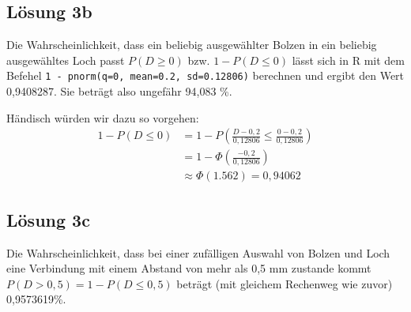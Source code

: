 \documentclass[main.tex]{subfiles}
\begin{document}
\subsection{Lösung 3b}
\lstset{language=R}

Die Wahrscheinlichkeit, dass ein beliebig ausgewählter Bolzen in ein beliebig ausgewähltes Loch passt $P(D \geq 0)$ bzw. $1-P(D \leq 0)$ lässt sich in R mit dem Befehel \lstinline|1 - pnorm(q=0, mean=0.2, sd=0.12806)| berechnen und ergibt den Wert 0,9408287. Sie beträgt also ungefähr 94,083 \%.

Händisch würden wir dazu so vorgehen: $$\begin{aligned}
    1 - P(D\leq 0) &= 1 - P\left(\frac{D- 0,2}{0,12806} \leq \frac{0-0,2}{0,12806}\right)\\[2mm]
    &= 1 - \Phi \left(\frac{-0,2}{0,12806}\right)\\[2mm]
    &\approx \Phi(1.562) = 0,94062
\end{aligned}$$

\subsection{Lösung 3c}
Die Wahrscheinlichkeit, dass bei einer zufälligen Auswahl von Bolzen und Loch eine Verbindung mit einem Abstand von mehr als 0,5 mm zustande kommt $P(D > 0,5) = 1 - P(D\leq 0,5)$ beträgt (mit gleichem Rechenweg wie zuvor) 0,9573619\%.
\end{document}
